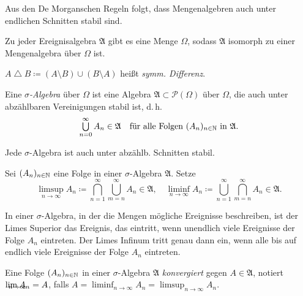 \documentclass{cheat-sheet}
\newcommand{\Alg}{\mathfrak{A}} %
\DeclareMathOperator{\symmdiff}{\triangle}
\begin{document}
\begin{bem}
  Aus den De Morganschen Regeln folgt, dass Mengenalgebren auch unter endlichen Schnitten stabil sind.
\end{bem}

\begin{satz}
  Zu jeder Ereignisalgebra $\Alg$ gibt es eine Menge $\Omega$, sodass $\Alg$ isomorph zu einer Mengenalgebra über $\Omega$ ist.
\end{satz}

\begin{nota}
  $A \symmdiff B \coloneqq (A \setminus B) \cup (B \setminus A)$ heißt \emph{symm. Differenz}.
\end{nota}

\begin{defn}
  Eine \emph{$\sigma$-Algebra} über $\Omega$ ist eine Algebra $\Alg \subset \mathcal{P}(\Omega)$ über $\Omega$, die auch unter abzählbaren Vereinigungen stabil ist, d.\,h.
  \[ \bigcup_{n = 0}^{\infty} A_n \in \Alg \quad \text{für alle Folgen $(A_n)_{n \in \N}$ in $\Alg$}. \]
\end{defn}


\begin{bem}
  Jede $\sigma$-Algebra ist auch unter abzählb. Schnitten stabil.
\end{bem}


\begin{defn}
  Sei $(A_n)_{n \in \mathbb{N}}$ eine Folge in einer $\sigma$-Algebra $\Alg$. Setze
  \[
    \limsup_{n \to \infty} A_n \coloneqq \bigcap_{n = 1}^{\infty} \bigcup_{m = n}^{\infty} A_n \in \Alg, \quad
    \liminf_{n \to \infty} A_n \coloneqq \bigcup_{n = 1}^{\infty} \bigcap_{m = n}^{\infty} A_n \in \Alg.
  \]
\end{defn}

\begin{bem}
  In einer $\sigma$-Algebra, in der die Mengen mögliche Ereignisse beschreiben, ist der Limes Superior das Ereignis, das eintritt, wenn unendlich viele Ereignisse der Folge $A_n$ eintreten. Der Limes Infinum tritt genau dann ein, wenn alle bis auf endlich viele Ereignisse der Folge $A_n$ eintreten.
\end{bem}

\begin{defn}
  Eine Folge $(A_n)_{n \in \mathbb{N}}$ in einer $\sigma$-Algebra $\Alg$ \emph{konvergiert} gegen $A \in \Alg$, notiert $\lim_{\mathclap{n \to \infty}} A_n = A$, falls $A = \liminf_{n \to \infty} A_n = \limsup_{n \to \infty} A_n$.
\end{defn}
\end{document}
